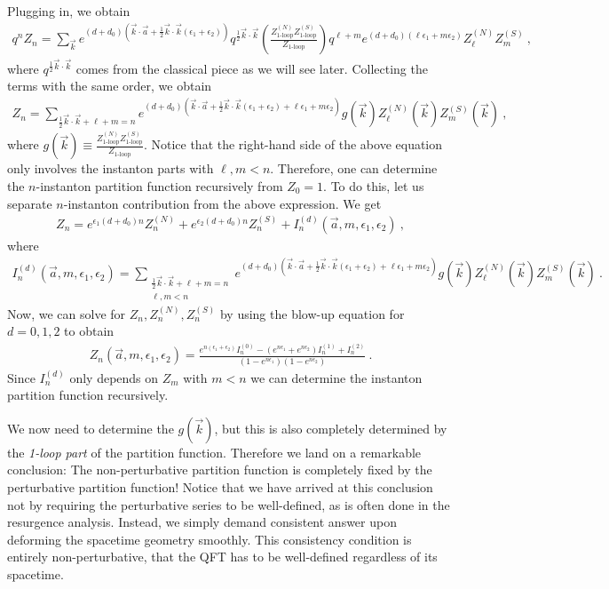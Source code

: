 \documentclass[letterpaper, 11pt]{article}
\def\e{\epsilon}
\def\half{\frac{1}{2}}
\begin{document}
Plugging in, we obtain
\begin{align}
 q^n Z_n = \sum_{\vec{k}} e^{(d+d_0)\left( \vec{k} \cdot \vec{a} + \half \vec{k} \cdot \vec{k} (\e_1 + \e_2)\right)} q^{\half \vec{k}\cdot \vec{k}} \left( \frac{Z^{(N)}_{\textrm{1-loop}} Z^{(S)}_{\textrm{1-loop}}}{Z_{\textrm{1-loop}}} \right) q^{\ell + m} e^{(d+d_0)(\ell \e_1 + m \e_2)} Z^{(N)}_{\ell} Z^{(S)}_m  \ , 
\end{align}
where $q^{\half \vec{k} \cdot \vec{k}}$ comes from the classical piece as we will see later. Collecting the terms with the same order, we obtain
\begin{align}
 Z_n = \sum_{\half \vec{k}\cdot\vec{k} + \ell + m = n} e^{(d+d_0)\left( \vec{k} \cdot \vec{a} + \half \vec{k} \cdot \vec{k} (\e_1 + \e_2) + \ell \e_1 + m \e_2 \right)} g(\vec{k}) Z^{(N)}_{\ell}(\vec{k}) Z^{(S)}_m (\vec{k}) \ , 
\end{align}
where $g(\vec{k}) \equiv \frac{Z^{(N)}_{\textrm{1-loop}} Z^{(S)}_{\textrm{1-loop}}}{Z_{\textrm{1-loop}}}$. Notice that the right-hand side of the above equation only involves the instanton parts with $\ell , m < n$. Therefore, one can determine the $n$-instanton partition function recursively from $Z_0 = 1$. 
To do this, let us separate $n$-instanton contribution from the above expression. We get 
\begin{align}
 Z_n = e^{\e_1 (d+d_0) n} Z^{(N)}_n + e^{\e_2 (d+d_0) n} Z^{(S)}_n + I_n^{(d)}(\vec{a}, m, \e_1, \e_2) \ , 
\end{align}
where
\begin{align}
I_n^{(d)}(\vec{a}, m, \e_1, \e_2) = \sum_{\substack{\half \vec{k}\cdot\vec{k} + \ell + m = n \\ \ell, m < n}} e^{(d+d_0)\left( \vec{k} \cdot \vec{a} + \half \vec{k} \cdot \vec{k} (\e_1 + \e_2) + \ell \e_1 + m \e_2 \right)} g(\vec{k}) Z^{(N)}_{\ell}(\vec{k}) Z^{(S)}_m (\vec{k}) \ . 
\end{align}
Now, we can solve for $Z_n, Z_n^{(N)}, Z_n^{(S)}$ by using the blow-up equation for $d=0, 1, 2$ to obtain
\begin{align}
 Z_n (\vec{a}, m, \e_1, \e_2) = \frac{e^{n(\e_1 + \e_2)} I_n^{(0)} - (e^{n\e_1} + e^{n \e_2}) I_n^{(1)} + I_n^{(2)} }{(1-e^{n\e_1})(1-e^{n\e_2})} \ . 
\end{align}
Since $I_n^{(d)}$ only depends on $Z_m$ with $m<n$ we can determine the instanton partition function recursively. 

We now need to determine the $g(\vec{k})$, but this is also completely determined by the \emph{1-loop part} of the partition function. Therefore we land on a remarkable conclusion: The non-perturbative partition function is completely fixed by the perturbative partition function! Notice that we have arrived at this conclusion not by requiring the perturbative series to be well-defined, as is often done in the resurgence analysis. Instead, we simply demand consistent answer upon deforming the spacetime geometry smoothly. This consistency condition is entirely non-perturbative, that the QFT has to be well-defined regardless of its spacetime. 
\end{document}
